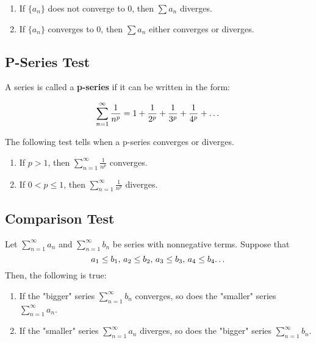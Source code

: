 \documentclass[11pt]{article}
\begin{document}
\begin{center}
\begin{enumerate}
    \item If $\{a_n\}$ does not converge to $0$, then $\sum a_n$ diverges.
    \item If $\{a_n\}$ converges to $0$, then $\sum a_n$ either converges or diverges.
\end{enumerate}
\end{center}
\vspace{0.5 cm}


\subsection{P-Series Test}
A series is called a \textbf{p-series} if it can be written in the form:

\[ \sum_{n=1}^{\infty} \frac{1}{n^p} = 1 + \frac{1}{2^p} + \frac{1}{3^p} + \frac{1}{4^p} + \text{\dots}\]

The following test tells when a p-series converges or diverges.\\

\begin{center}
\begin{enumerate}
    \item If $p>1$, then $\sum_{n=1}^{\infty} \frac{1}{n^p}$ converges.
    \item If $0<p\leq 1$, then $\sum_{n=1}^{\infty} \frac{1}{n^p}$ diverges.
\end{enumerate}
\end{center}
\vspace{0.5 cm}

\subsection{Comparison Test}
Let $\sum_{n=1}^{\infty} a_n$ and $\sum_{n=1}^{\infty} b_n$ be series with nonnegative terms. Suppose that  
\[ a_1\leq b_1\text{, } a_2\leq b_2\text{, } a_3\leq b_3\text{, } a_4\leq b_4\text{\dots} \]
Then, the following is true: \\

\begin{center}
\begin{enumerate}
    \item If the "bigger" series $\sum_{n=1}^{\infty} b_n$ converges, so does the "smaller" series $\sum_{n=1}^{\infty} a_n$.
    \item If the "smaller" series $\sum_{n=1}^{\infty} a_n$ diverges, so does the "bigger" series $\sum_{n=1}^{\infty} b_n$.
\end{enumerate}
\end{center}
\vspace{0.5 cm}
\end{document}
